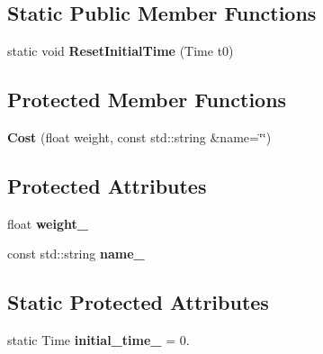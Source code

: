 \subsection*{Static Public Member Functions}
\begin{DoxyCompactItemize}
\item 
static void {\bfseries Reset\+Initial\+Time} (Time t0)\hypertarget{classilqgames_1_1_cost_a3ac607a91844c85761467f08326245e5}{}\label{classilqgames_1_1_cost_a3ac607a91844c85761467f08326245e5}

\end{DoxyCompactItemize}
\subsection*{Protected Member Functions}
\begin{DoxyCompactItemize}
\item 
{\bfseries Cost} (float weight, const std\+::string \&name=\char`\"{}\char`\"{})\hypertarget{classilqgames_1_1_cost_a9b30ac1d7733741609a3c8d6522a925b}{}\label{classilqgames_1_1_cost_a9b30ac1d7733741609a3c8d6522a925b}

\end{DoxyCompactItemize}
\subsection*{Protected Attributes}
\begin{DoxyCompactItemize}
\item 
float {\bfseries weight\+\_\+}\hypertarget{classilqgames_1_1_cost_a03c98f733c0e722960dad9e80e235652}{}\label{classilqgames_1_1_cost_a03c98f733c0e722960dad9e80e235652}

\item 
const std\+::string {\bfseries name\+\_\+}\hypertarget{classilqgames_1_1_cost_a36d7d9ee9585912fc98fca10d9c81614}{}\label{classilqgames_1_1_cost_a36d7d9ee9585912fc98fca10d9c81614}

\end{DoxyCompactItemize}
\subsection*{Static Protected Attributes}
\begin{DoxyCompactItemize}
\item 
static Time {\bfseries initial\+\_\+time\+\_\+} = 0.\hypertarget{classilqgames_1_1_cost_ab86100ec9752b36fd5b6a338964f73cc}{}\label{classilqgames_1_1_cost_ab86100ec9752b36fd5b6a338964f73cc}

\end{DoxyCompactItemize}


